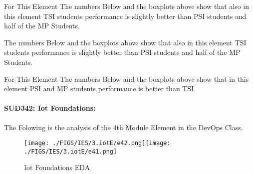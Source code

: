 \documentclass[12pt]{extreport}
\begin{document}
For This Element  The numbers Below and the boxplots above show that also in this element  TSI students performance is slightly better than PSI students and half of the MP Students.

\begin{comment}


\begin{enumerate}	
	\item The MP Class Box-Plot:
	\begin{enumerate}
		\item MAX = a {} {} {} {} {} {} {} {} UQ = b {} {} {} {} {} {} {} {} Median = c
		\item LQ = d {} {} {} {} {} {} {} {}  MIN =	l {} {} {} {} {} {} {} {}  IQR = e - f = g
	\end{enumerate}
	\item The PSI Class Box-Plot:
	\begin{enumerate}
		\item MAX = a {} {} {} {} {} {} {} {} UQ = b {} {} {} {} {} {} {} {} Median = c
		\item LQ = d {} {} {} {} {} {} {} {}  MIN =	e {} {} {} {} {} {} {} {} IQR = f - g = h	
	\end{enumerate}
	\item The TSI Class Box-Plot:
	\begin{enumerate}
		\item MAX = a {} {} {} {} {} {} {} {} UQ = b {} {} {} {} {} {} {} {} Median = c
		\item LQ = d {} {} {} {} {} {} {} {} MIN = e {} {} {} {} {} {} {} {} IQR = f - g = h	
	\end{enumerate}
\end{enumerate}

\end{comment}

The numbers Below and the boxplots above show that also in this element  TSI students performance is slightly better than PSI students and half of the MP Students.

For This Element The numbers Below and the boxplots above show that in this element  PSI and MP students performance is  better than TSI.



\paragraph{\large SUD342: Iot Foundations:} 
The Folowing is the analysis of the 4th Module Element in the DevOps Class.
\begin{figure}[H]
	\centering
	\texttt{[image: ./FIGS/IES/3.iotE/e42.png]}\texttt{[image: ./FIGS/IES/3.iotE/e41.png]}
	\caption{Iot Foundations EDA}
	\label{fig:33}
\end{figure}
\end{document}
